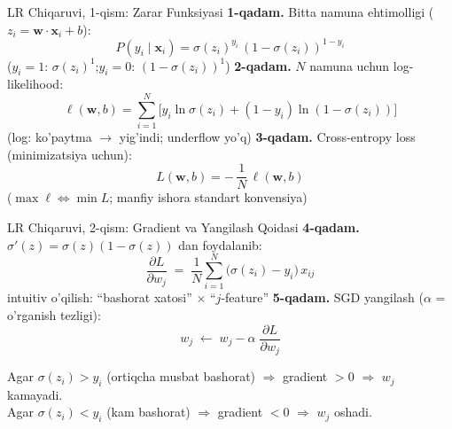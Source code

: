 \documentclass[aspectratio=169,11pt]{beamer}
\begin{document}
\begin{frame}{LR Chiqaruvi, 1-qism: Zarar Funksiyasi}
  \small
  \textbf{1-qadam.} Bitta namuna ehtimolligi ($z_i=\mathbf{w}\cdot\mathbf{x}_i+b$):
  \[
    P(y_i\mid\mathbf{x}_i)
    = \sigma(z_i)^{y_i}\,(1-\sigma(z_i))^{1-y_i}
  \]
  \textcolor{halfgray}{\footnotesize
    ($y_i{=}1$: $\sigma(z_i)^1$;\quad $y_i{=}0$: $(1-\sigma(z_i))^1$)}
  \pause
  \textbf{2-qadam.} $N$ namuna uchun log-likelihood:
  \[
    \ell(\mathbf{w},b)
    =\sum_{i=1}^{N}
    \bigl[y_i\ln\sigma(z_i)+(1-y_i)\ln(1-\sigma(z_i))\bigr]
  \]
  \textcolor{halfgray}{\footnotesize
    (log: ko'paytma $\to$ yig'indi; underflow yo'q)}
  \pause
  \textbf{3-qadam.} Cross-entropy loss (minimizatsiya uchun):
  \[
    L(\mathbf{w},b) = -\,\frac{1}{N}\,\ell(\mathbf{w},b)
  \]
  \textcolor{halfgray}{\footnotesize
    ($\max\ell \Leftrightarrow \min L$; manfiy ishora standart konvensiya)}
\end{frame}

\begin{frame}{LR Chiqaruvi, 2-qism: Gradient va Yangilash Qoidasi}
  \small
  \textbf{4-qadam.} $\sigma'(z)=\sigma(z)(1-\sigma(z))$ dan foydalanib:
  \[
    \frac{\partial L}{\partial w_j}
    \;=\;
    \frac{1}{N}\sum_{i=1}^{N}\bigl(\sigma(z_i)-y_i\bigr)\,x_{ij}
  \]
  \textcolor{halfgray}{\footnotesize
    intuitiv o'qilish: ``bashorat xatosi'' $\times$ ``$j$-feature''}
  \pause
  \textbf{5-qadam.} SGD yangilash ($\alpha$ = o'rganish tezligi):
  \[
    w_j \;\leftarrow\; w_j
    - \alpha\;\frac{\partial L}{\partial w_j}
  \]
  \vspace{3pt}
  \begin{tcolorbox}[okbox,title=Mantiq]
    \small
    Agar $\sigma(z_i)>y_i$ (ortiqcha musbat bashorat)
    $\Rightarrow$ gradient $>0$
    $\Rightarrow$ $w_j$ kamayadi.\\[3pt]
    Agar $\sigma(z_i)<y_i$ (kam bashorat)
    $\Rightarrow$ gradient $<0$
    $\Rightarrow$ $w_j$ oshadi.
  \end{tcolorbox}
\end{frame}
\end{document}
